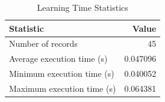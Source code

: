 
\begin{table}[h!]
\centering
\begin{tabular}{l r}
\hline
Statistic & Value \\
\hline
Number of records & 45 \\
Average execution time (s) & 0.047096 \\
Minimum execution time (s) & 0.040052 \\
Maximum execution time (s) & 0.064381 \\
\hline
\end{tabular}
\caption{Learning Time Statistics}
\end{table}
